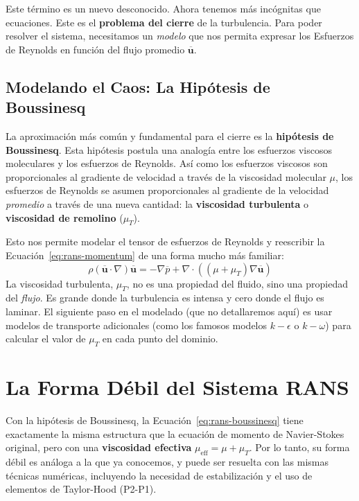 Este término es un nuevo desconocido. Ahora tenemos más incógnitas que ecuaciones. Este es el \textbf{problema del cierre} de la turbulencia. Para poder resolver el sistema, necesitamos un \textit{modelo} que nos permita expresar los Esfuerzos de Reynolds en función del flujo promedio \(\overline{\bm{u}}\).

\subsection{Modelando el Caos: La Hipótesis de Boussinesq}
La aproximación más común y fundamental para el cierre es la \textbf{hipótesis de Boussinesq}. Esta hipótesis postula una analogía entre los esfuerzos viscosos moleculares y los esfuerzos de Reynolds. Así como los esfuerzos viscosos son proporcionales al gradiente de velocidad a través de la viscosidad molecular \(\mu\), los esfuerzos de Reynolds se asumen proporcionales al gradiente de la velocidad \textit{promedio} a través de una nueva cantidad: la \textbf{viscosidad turbulenta} o \textbf{viscosidad de remolino} (\(\mu_T\)).

Esto nos permite modelar el tensor de esfuerzos de Reynolds y reescribir la Ecuación~\eqref{eq:rans-momentum} de una forma mucho más familiar:
\begin{equation}
    \rho(\overline{\bm{u}} \cdot \nabla)\overline{\bm{u}} = -\nabla \overline{p} + \nabla \cdot ((\mu + \mu_T) \nabla\overline{\bm{u}})
    \label{eq:rans-boussinesq}
\end{equation}
La viscosidad turbulenta, \(\mu_T\), no es una propiedad del fluido, sino una propiedad del \textit{flujo}. Es grande donde la turbulencia es intensa y cero donde el flujo es laminar. El siguiente paso en el modelado (que no detallaremos aquí) es usar modelos de transporte adicionales (como los famosos modelos \(k-\epsilon\) o \(k-\omega\)) para calcular el valor de \(\mu_T\) en cada punto del dominio.

\section{La Forma Débil del Sistema RANS}
\label{sec:rans-weak}
Con la hipótesis de Boussinesq, la Ecuación~\eqref{eq:rans-boussinesq} tiene exactamente la misma estructura que la ecuación de momento de Navier-Stokes original, pero con una \textbf{viscosidad efectiva} \(\mu_{\text{eff}} = \mu + \mu_T\). Por lo tanto, su forma débil es análoga a la que ya conocemos, y puede ser resuelta con las mismas técnicas numéricas, incluyendo la necesidad de estabilización y el uso de elementos de Taylor-Hood (P2-P1).

